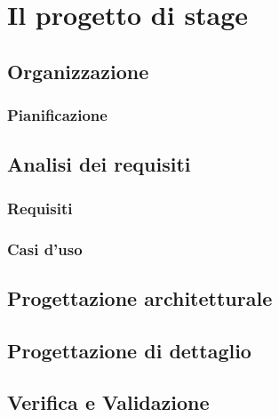 
\chapter{Il progetto di stage}
\label{cap:il-progetto-di-stage}


\section{Organizzazione}
\subsection{Pianificazione}

\section{Analisi dei requisiti}
\subsection{Requisiti}
\subsection{Casi d'uso}

\section{Progettazione architetturale}
\section{Progettazione di dettaglio}

\section{Verifica e Validazione}
